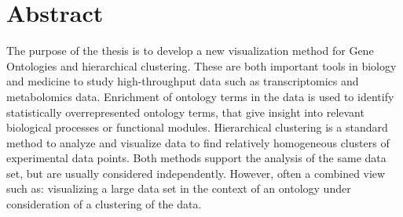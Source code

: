 \section*{Abstract}

The purpose of the thesis is to develop a new visualization method for Gene Ontologies and hierarchical clustering. These are both important tools in biology and medicine to study high-throughput data such as transcriptomics and metabolomics data. Enrichment of ontology terms in the data is used to identify statistically overrepresented ontology terms, that give insight into relevant biological processes or functional modules. Hierarchical clustering is a standard method to analyze and visualize data to find relatively homogeneous clusters of experimental data points. Both methods support the analysis of the same data set, but are usually considered independently. However, often a combined view such as: visualizing a large data set in the context of an ontology under consideration of a clustering of the data.